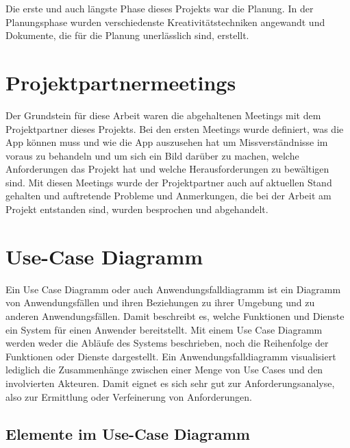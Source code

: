 
Die erste und auch längste Phase dieses Projekts war die Planung. 
In der Planungsphase wurden verschiedenste Kreativitätstechniken angewandt und Dokumente, die für die Planung unerlässlich sind, erstellt.

\section{Projektpartnermeetings}

Der Grundstein für diese Arbeit waren die abgehaltenen Meetings mit dem Projektpartner dieses Projekts. Bei den ersten Meetings wurde definiert, was die App können muss und wie die App auszusehen hat
um Missverständnisse im voraus zu behandeln und um sich ein Bild darüber zu machen, welche Anforderungen das Projekt hat und welche Herausforderungen zu bewältigen sind. 
Mit diesen Meetings wurde der Projektpartner auch auf aktuellen Stand gehalten und auftretende Probleme und Anmerkungen, 
die bei der Arbeit am Projekt entstanden sind, wurden besprochen und abgehandelt.

\section{Use-Case Diagramm}

Ein Use Case Diagramm \cite{UseCaseDiagramm} oder auch Anwendungsfalldiagramm ist ein Diagramm von Anwendungsfällen und ihren Beziehungen zu ihrer Umgebung und zu anderen Anwendungsfällen. 
Damit beschreibt es, welche Funktionen und Dienste ein System für einen Anwender bereitstellt.
Mit einem Use Case Diagramm werden weder die Abläufe des Systems beschrieben, 
noch die Reihenfolge der Funktionen oder Dienste dargestellt. 
Ein Anwendungsfalldiagramm visualisiert lediglich die Zusammenhänge zwischen einer Menge von Use Cases und den involvierten Akteuren. Damit eignet es sich sehr gut zur Anforderungsanalyse, also zur Ermittlung oder Verfeinerung von Anforderungen.
\pagebreak
\subsection{Elemente im Use-Case Diagramm}


